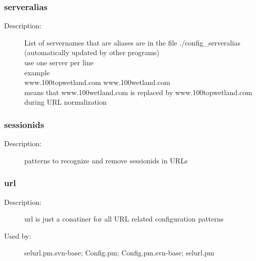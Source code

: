 \subsubsection{serveralias}
\label{serveralias}
\begin{description}
\item[Description:] List of servernames that are aliases are in the file ./config\_serveralias \\     (automatically updated by other programs) \\ use one server per line \\ example \\ www.100topwetland.com  www.100wetland.com \\   means that www.100wetland.com is replaced by www.100topwetland.com during URL normalization
\end{description}
\subsubsection{sessionids}
\label{sessionids}
\begin{description}
\item[Description:] patterns to recognize and remove sessionids in URLs
\end{description}
\subsubsection{url}
\label{url}
\begin{description}
\item[Description:] url is just a conatiner for all URL related configuration patterns
\item[Used by:] selurl.pm.svn-base; Config.pm; Config.pm.svn-base; selurl.pm
\end{description}
